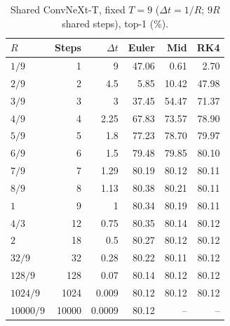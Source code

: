 \begin{table}[t]
    \centering
    \caption{Shared ConvNeXt-T, fixed $T{=}9$ ($\Delta t{=}1/R$; $9R$ shared steps), top-1 (\%).}
    \label{tab:app-shared-t9}
    \setlength{\tabcolsep}{3.5pt}
    \small
    \begin{tabular}{lrrrrr}
        \toprule
        $R$ & Steps & $\Delta t$ & Euler & Mid & RK4 \\
        \midrule
        $1/9$   & 1     & 9      & 47.06 & 0.61  & 2.70 \\
        $2/9$   & 2     & 4.5    & 5.85  & 10.42 & 47.98 \\
        $3/9$   & 3     & 3      & 37.45 & 54.47 & 71.37 \\
        $4/9$   & 4     & 2.25   & 67.83 & 73.57 & 78.90 \\
        $5/9$   & 5     & 1.8    & 77.23 & 78.70 & 79.97 \\
        $6/9$   & 6     & 1.5    & 79.48 & 79.85 & 80.10 \\
        $7/9$   & 7     & 1.29   & 80.19 & 80.12 & 80.11 \\
        $8/9$   & 8     & 1.13   & 80.38 & 80.21 & 80.11 \\
        $1$     & 9     & 1      & 80.34 & 80.19 & 80.11 \\
        $4/3$   & 12    & 0.75   & 80.35 & 80.14 & 80.12 \\
        $2$     & 18    & 0.5    & 80.27 & 80.12 & 80.12 \\
        $32/9$  & 32    & 0.28   & 80.22 & 80.11 & 80.12 \\
        $128/9$ & 128   & 0.07   & 80.14 & 80.12 & 80.12 \\
        $1024/9$& 1024  & 0.009  & 80.12 & 80.12 & 80.12 \\
        $10000/9$&10000 & 0.0009 & 80.12 & --    & -- \\
        \bottomrule
    \end{tabular}
\end{table}

